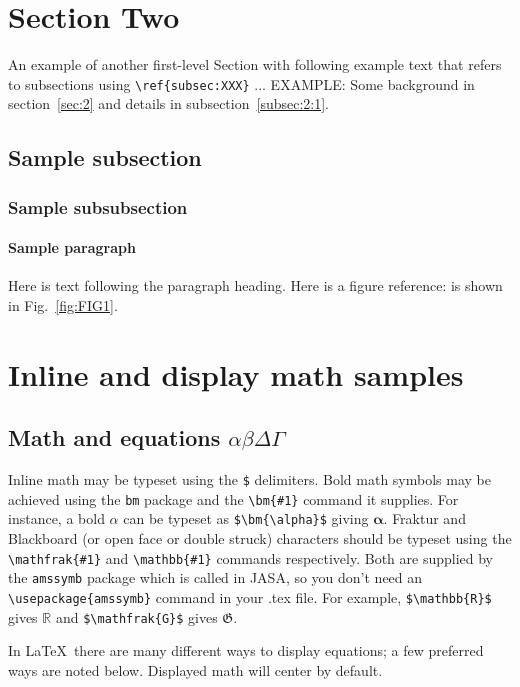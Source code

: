 \documentclass[preprint]{JASA}
\begin{document}
\section{\label{sec:2} Section Two}

An example of another first-level Section with following example text that refers to subsections using 
\verb+\ref{subsec:XXX}+ ...  EXAMPLE: Some background in
section~\ref{sec:2} and details  in subsection~\ref{subsec:2:1}. 

\subsection{\label{subsec:2:1} Sample subsection}


   \subsubsection{Sample subsubsection\label{subsubsec:1}}

\paragraph{Sample paragraph}Here is text following the paragraph
heading.
Here is a figure reference: is shown in Fig.~\ref{fig:FIG1}.

\section{Inline and display math samples\label{sec:3}}

\subsection{\label{subsec:3:3} Math and equations $\alpha\beta\Delta\Gamma$}
Inline math may be typeset using the \verb+$+ delimiters. Bold math
symbols may be achieved using the \verb+bm+ package and the
\verb+\bm{#1}+ command it supplies. For instance, a bold $\alpha$ can
be typeset as \verb+$\bm{\alpha}$+ giving $\bm{\alpha}$. Fraktur and
Blackboard (or open face or double struck) characters should be
typeset using the \verb+\mathfrak{#1}+ and \verb+\mathbb{#1}+ commands
respectively. Both are supplied by the \texttt{amssymb} package which
is called in JASA, so you don't need an \verb+\usepackage{amssymb}+
command in your .tex file. For
example, \verb+$\mathbb{R}$+ gives $\mathbb{R}$ and
\verb+$\mathfrak{G}$+ gives $\mathfrak{G}$.

In \LaTeX\ there are many different ways to display equations; a
few preferred ways are noted below. Displayed math will center by
default. 
\end{document}

